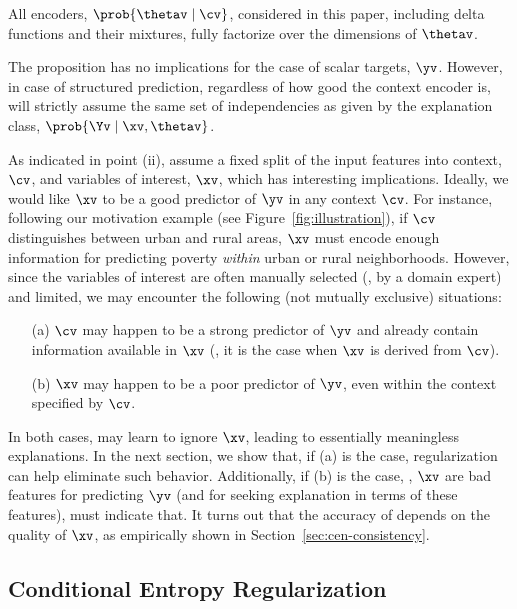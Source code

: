\documentclass[twoside,11pt]{article}
\begin{document}
\begin{remark}
    All encoders, $\prob{\thetav \mid \cv}$, considered in this paper, including delta functions and their mixtures, fully factorize over the dimensions of $\thetav$.
\end{remark}
\begin{remark}
    The proposition has no implications for the case of scalar targets, $\yv$.
    However, in case of structured prediction, regardless of how good the context encoder is, {\CEN} will strictly assume the same set of independencies as given by the explanation class, $\prob{\Yv \mid \xv, \thetav}$.
\end{remark}

\noindent
As indicated in point (ii), {\CENs} assume a fixed split of the input features into context, $\cv$, and variables of interest, $\xv$, which has interesting implications.
Ideally, we would like $\xv$ to be a good predictor of $\yv$ in any context $\cv$.
For instance, following our motivation example (see Figure~\ref{fig:illustration}), if $\cv$ distinguishes between urban and rural areas, $\xv$ must encode enough information for predicting poverty \emph{within} urban or rural neighborhoods.
However, since the variables of interest are often manually selected (\eg, by a domain expert) and limited, we may encounter the following (not mutually exclusive) situations:
\begin{itemize}[itemsep=0pt,parsep=1ex,topsep=1ex]
    \item[(a)] $\cv$ may happen to be a strong predictor of $\yv$ and already contain information available in $\xv$ (\eg, it is the case when $\xv$ is derived from $\cv$).
    \item[(b)] $\xv$ may happen to be a poor predictor of $\yv$, even within the context specified by $\cv$.
\end{itemize}
In both cases, {\CEN} may learn to ignore $\xv$, leading to essentially meaningless explanations.
In the next section, we show that, if (a) is the case, regularization can help eliminate such behavior.
Additionally, if (b) is the case, \ie, $\xv$ are bad features for predicting $\yv$ (and for seeking explanation in terms of these features), {\CEN} must indicate that.
It turns out that the accuracy of {\CEN} depends on the quality of $\xv$, as empirically shown in Section~\ref{sec:cen-consistency}.


\subsection{Conditional Entropy Regularization}
\label{sec:encoder-regularization}
\end{document}
